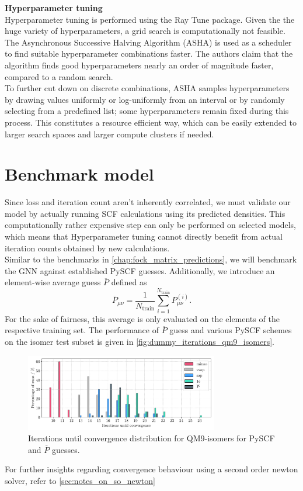 \textbf{Hyperparameter tuning}\\
Hyperparameter tuning is performed using the Ray Tune \parencite{ref:ray_tune} package. Given the the huge variety of hyperparameters, a grid search is computationally not feasible. The Asynchronous Successive Halving Algorithm (ASHA) is used as a scheduler to find suitable hyperparameter combinations faster. The authors claim that the algorithm finds good hyperparameters nearly an order of magnitude faster, compared to a random search. \parencite{ref:ASHA}\\
To further cut down on discrete combinations, ASHA samples hyperparameters by drawing values uniformly or log-uniformly from an interval or by randomly selecting from a predefined list; some hyperparameters remain fixed during this process. This constitutes a resource efficient way, which can be easily extended to larger search spaces and larger compute clusters if needed. 

\section{Benchmark model}
\label{sec:0_d_benchmark_model}
Since loss and iteration count aren't inherently correlated, we must validate our model by actually running SCF calculations using its predicted densities. This computationally rather expensive step can only be performed on selected models, which means that Hyperparameter tuning cannot directly benefit from actual iteration counts obtained by new calculations.\\
Similar to the benchmarks in \autoref{chap:fock_matrix_predictions}, we will benchmark the GNN against established PySCF guesses. Additionally, we introduce an element-wise average guess $\overline{P}$ defined as 
\begin{equation}
    \label{eq:avg_guess}
    \overline{P}_{\mu\nu} = \frac{1}{N_\text{train}} \sum_{i=1}^{N_\text{train}} P^{(i)}_{\mu\nu}.
\end{equation}
For the sake of fairness, this average is only evaluated on the elements of the respective training set. The performance of $\overline{P}$ guess and various PySCF schemes on the  isomer test subset is given in \autoref{fig:dummy_iterations_qm9_isomers}. 
\begin{figure}[H]
    \centering
    \includegraphics[width=0.75\textwidth]{../fig/gnn/0_d_model_iteration_count_bar.pdf}
    \caption[Iterations until convergence distribution for QM9-isomers]{Iterations until convergence distribution for QM9-isomers for PySCF and $\overline{P}$ guesses.}
    \label{fig:dummy_iterations_qm9_isomers}
\end{figure}
For further insights regarding convergence behaviour using a second order newton solver, refer to \autoref{sec:notes_on_so_newton} 